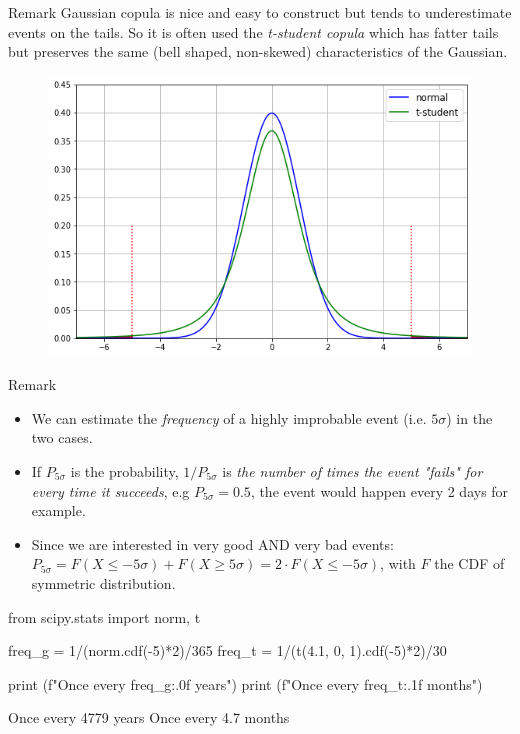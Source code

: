 \documentclass{beamer}
\begin{document}
\begin{frame}{Remark}
Gaussian copula is nice and easy to construct but tends to underestimate events on the tails. So it is often used the \emph{t-student copula} which has fatter tails but preserves the same (bell shaped, non-skewed) characteristics of the Gaussian.

\begin{figure}[h]
  \begin{center}
    \includegraphics[width=0.5\linewidth]{gauss_vs_t}
  \end{center}
\end{figure}
\end{frame}

\begin{frame}[fragile]{Remark}
\begin{itemize}
	\item We can estimate the \emph{frequency} of a highly improbable event (i.e. $5\sigma$) in the two cases.
	\item If $P_{5\sigma}$ is the probability, $1/P_{5\sigma}$ is \emph{the number of times the event "fails" for every time it succeeds}, e.g $P_{5\sigma}=0.5$, the event would happen every 2 days for example.
	\item Since we are interested in very good AND very bad events:
	$P_{5\sigma} = F(X\leq-5\sigma) + F(X\geq5\sigma) = 2\cdot F(X\leq-5\sigma)$, with $F$ the CDF of symmetric distribution. 
\end{itemize}
 \begin{ipython}
from scipy.stats import norm, t

freq_g = 1/(norm.cdf(-5)*2)/365
freq_t = 1/(t(4.1, 0, 1).cdf(-5)*2)/30

print (f"Once every {freq_g:.0f} years")
print (f"Once every {freq_t:.1f} months")
\end{ipython}
\begin{ioutput}
Once every 4779 years
Once every 4.7 months
\end{ioutput}
\end{frame}
\end{document}
